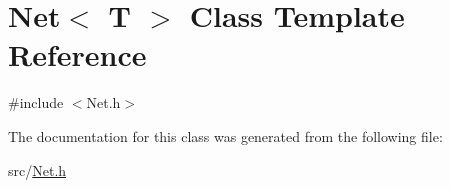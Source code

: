 \hypertarget{class_net}{}\section{Net$<$ T $>$ Class Template Reference}
\label{class_net}


{\ttfamily \#include $<$Net.\+h$>$}



The documentation for this class was generated from the following file\+:\begin{DoxyCompactItemize}
\item 
src/\hyperlink{_net_8h}{Net.\+h}\end{DoxyCompactItemize}
